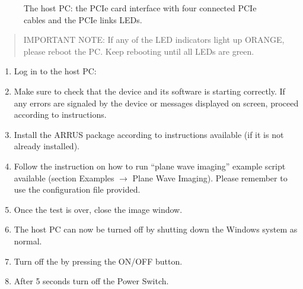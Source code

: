 \documentclass[letterpaper,10pt,english]{sphinxmanual}
\begin{document}
\begin{figure}[htbp]
\centering
\capstart

\noindent{}
\caption{The host PC: the PCIe card interface with four connected PCIe cables and the PCIe links LEDs.}\label{\detokenize{content/set-up:id3}}\end{figure}
\begin{quote}

\sphinxAtStartPar
IMPORTANT NOTE: If any of the LED indicators light up ORANGE, please reboot the PC. Keep rebooting until all LEDs are green.
\end{quote}
\begin{enumerate}
%
\setcounter{enumi}{4}
\item {} 
\sphinxAtStartPar
Log in to the host PC:

\sphinxAtStartPar
{}

\sphinxAtStartPar
{}

\item {} 
\sphinxAtStartPar
Make sure to check that the device and its software is starting
correctly. If any errors are signaled by the device or messages
displayed on screen, proceed according to instructions.

\item {} 
\sphinxAtStartPar
Install the ARRUS package according to instructions available
(if it is not already installed).

\item {} 
\sphinxAtStartPar
Follow the instruction on how to run “plane wave imaging” example script available  (section Examples \(\rightarrow\) Plane Wave Imaging). Please remember to use the configuration file provided.

\item {} 
\sphinxAtStartPar
Once the test is over, close the image window.

\item {} 
\sphinxAtStartPar
The host PC can now be turned off by shutting down the Windows
system as normal.

\item {} 
\sphinxAtStartPar
Turn off the  by pressing the ON/OFF button.

\item {} 
\sphinxAtStartPar
After 5 seconds turn off the Power Switch.

\end{enumerate}
\end{document}
